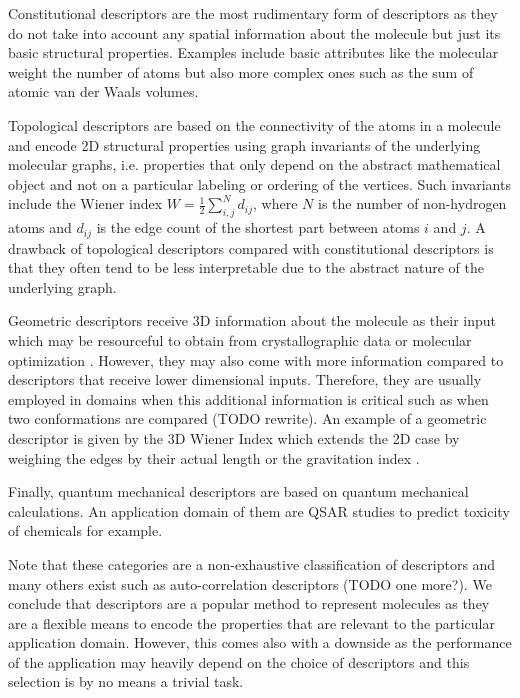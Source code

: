 Constitutional descriptors are the most rudimentary form of descriptors as they do not take into account any spatial information about the molecule but just its basic structural properties. Examples include basic attributes like the molecular weight the number of atoms but also more complex ones such as the sum of atomic van der Waals volumes. 

Topological descriptors are based on the connectivity of the atoms in a molecule and encode 2D structural properties using graph invariants of the underlying molecular graphs, i.e. properties that only depend on the abstract mathematical object and not on a particular labeling or ordering of the vertices. Such invariants include the Wiener index \cite{wiener1947structural, nikolic2001wiener} $W = \frac{1}{2} \sum_{i,j}^ N d_{ij}$, where $N$ is the number of non-hydrogen atoms and $d_{ij}$ is the edge count of the shortest part between atoms $i$ and $j$. A drawback of topological descriptors compared with constitutional descriptors is that they often tend to be less interpretable due to the abstract nature of the underlying graph. 

Geometric descriptors receive 3D information about the molecule as their input which may be resourceful to obtain from crystallographic data or molecular optimization \cite{Mauri2016}. However, they may also come with more information compared to descriptors that receive lower dimensional inputs. Therefore, they are usually employed in domains when this additional information is critical such as when two conformations are compared (TODO rewrite). An example of a geometric descriptor is given by the 3D Wiener Index which extends the 2D case by weighing the edges by their actual length or the gravitation index \cite{katritzky1996correlation}.

Finally, quantum mechanical descriptors are based on quantum mechanical calculations. An application domain of them are QSAR studies \citep{REENU201589, eroglu2007dft, senior2011qstr} to predict toxicity of chemicals for example.

Note that these categories are a non-exhaustive classification of descriptors and many others exist such as auto-correlation descriptors \citep{broto1984molecular} (TODO one more?). We conclude that descriptors are a popular method to represent molecules as they are a flexible means to encode the properties that are relevant to the particular application domain. However, this comes also with a downside as the performance of the application may heavily depend on the choice of descriptors and this selection is by no means a trivial task.

